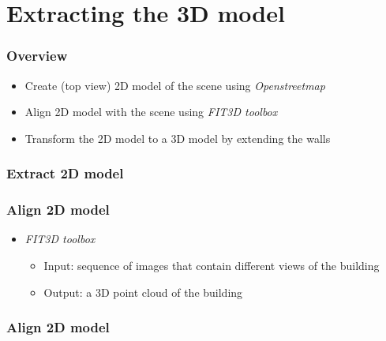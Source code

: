 \documentclass{beamer}
\begin{document}


\section{Extracting the 3D model}
\frame
{
	\frametitle{Overview}
	\begin{itemize}
	\item <+-| alert@+> Create (top view) 2D model of the scene using \emph{Openstreetmap}
	\item <+-| alert@+> Align 2D model with the scene using \emph{FIT3D toolbox}
	\item <+-| alert@+> Transform the 2D model to a 3D model by extending the walls
	\end{itemize}
}

\frame
{
	\frametitle{Extract 2D model}
}

\frame
{
	\frametitle{Align 2D model}
	\begin{itemize}
	\item <+-| alert@+> \emph{FIT3D toolbox}
		\begin{itemize}
		\item <+-| alert@+> Input: sequence of images that contain different views of the building
		\item <+-| alert@+> Output: a 3D point cloud of the building
		\end{itemize}
	\end{itemize}
}


\frame
{
	\frametitle{Align 2D model}
}
\end{document}
